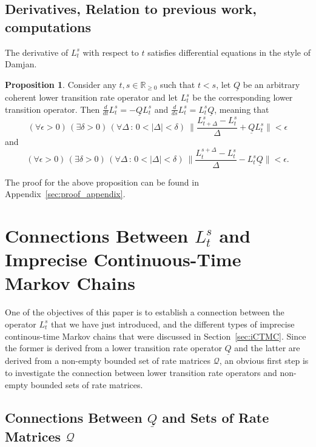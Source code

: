 \documentclass[10pt]{paper}
\theoremstyle{definition}
\newtheorem{proposition}[theorem]{Proposition}
\newcommand{\reals}{\mathbb{R}}
\newcommand{\realsnonneg}{\reals_{\geq 0}}
\newcommand{\lbound}{L}
\newcommand{\rateset}{\mathcal{Q}}
\newcommand{\lrate}{\underline{Q}}
\begin{document}
\subsection{Derivatives, Relation to previous work, computations}

The derivative of $\lbound_t^s$ with respect to $t$ satisfies differential equations in the style of Damjan.

\begin{proposition}\label{prop:lower_transition_has_deriv}
Consider any $t,s\in\realsnonneg$ such that $t<s$, let $\lrate$ be an arbitrary coherent lower transition rate operator and let $\lbound_t^s$ be the corresponding lower transition operator. Then $\frac{d}{dt}\lbound_t^s=-\lrate\lbound_t^s$ and $\frac{d}{ds}\lbound_t^s=\lbound_t^s\lrate$, meaning that
\begin{equation}\label{eq:lower_deriv_backward}
(\forall\epsilon>0)\,
(\exists\delta>0)\,
(\forall\Delta\,:\,0<\lvert\Delta\rvert <\delta)~
\Big\lVert\frac{L_{t+\Delta}^s-L_t^s}{\Delta}+\lrate L_t^s\Big\rVert<\epsilon
\end{equation}
and
\begin{equation}\label{eq:lower_deriv_forward}
(\forall\epsilon>0)\,
(\exists\delta>0)\,
(\forall\Delta\,:\,0<\lvert\Delta\rvert<\delta)~
\Big\lVert\frac{L_{t}^{s+\Delta}-L_t^s}{\Delta}-\lbound_t^s\lrate \Big\rVert<\epsilon.
\end{equation}
\end{proposition}
\noindent The proof for the above proposition can be found in Appendix~\ref{sec:proof_appendix}.

\section{Connections Between $L_t^s$ and Imprecise Continuous-Time Markov Chains}\label{sec:connections}

One of the objectives of this paper is to establish a connection between the operator $\lbound_t^s$ that we have just introduced, and the different types of imprecise continous-time Markov chains that were discussed in Section~\ref{sec:iCTMC}. Since the former is derived from a lower transition rate operator $\lrate$ and the latter are derived from a non-empty bounded set of rate matrices $\rateset$, an obvious first step is to investigate the connection between lower transition rate operators and non-empty bounded sets of rate matrices.

\subsection{Connections Between $\lrate$ and Sets of Rate Matrices $\rateset$}
\end{document}
